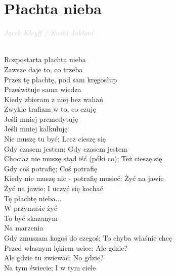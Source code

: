 \documentclass[a5paper, 10pt]{book}
\begin{document}
\newpage
\section{Płachta nieba}\textcolor{lightgray}{\textit{Jacek Kleyff / Kwiat Jabłoni}}\\~\\
\begin{minipage}[t]{0.8\textwidth}
\hspace*{5mm}Rozpostarta płachta nieba\\
\hspace*{5mm}Zawsze daje to, co trzeba\\
\hspace*{5mm}Przez tę płachtę, pod sam kręgosłup\\
\hspace*{5mm}Prześwituje sama wiedza\\
\hspace*{5mm}Kiedy zbieram z niej bez wahań\\
\hspace*{5mm}Zwykle trafiam w to, co czuję\\
\hspace*{5mm}Jeśli mniej premedytuję\\
\hspace*{5mm}Jeśli mniej kalkuluję\\

Nie muszę tu być; Lecz cieszę się\\
Gdy czasem jestem; Gdy czasem jestem\\
Chociaż nie muszę stąd iść (póki co); Też cieszę się\\
Gdy coś potrafię; Coś potrafię\\
Kiedy nie muszę nic - potrafię musieć; Żyć na jawie\\
Żyć na jawie; I uczyć się kochać\\

\hspace*{5mm}Tę płachtę nieba...\\

\hspace*{10mm}W przymusie żyć\\
\hspace*{10mm}To być skazanym\\
\hspace*{10mm}Na marzenia\\

Gdy zmuszam kogoś do czegoś; To chyba właśnie chcę\\
Przed własnym lękiem uciec; Ale gdzie?\\
Ale gdzie tu zwiewać; No gdzie?\\
Na tym świecie; I w tym ciele\\


\end{minipage}
\end{document}
